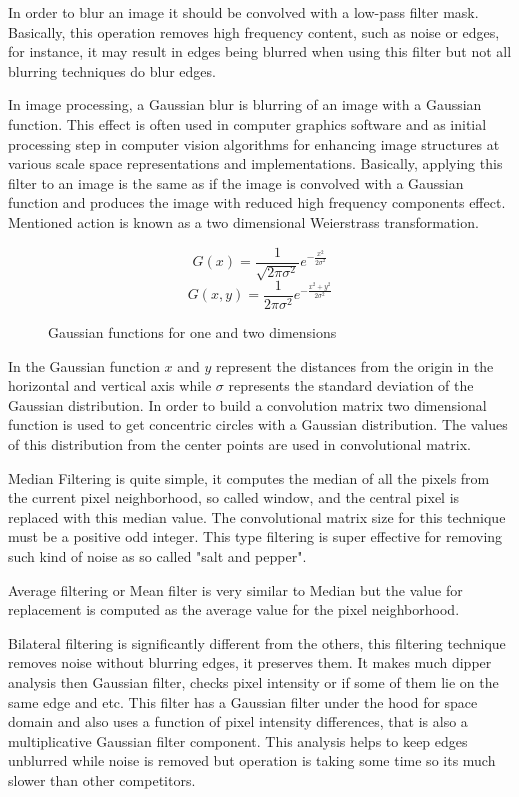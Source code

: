 \documentclass[../../../../main]{subfiles}
\begin{document}
In order to blur an image it should be convolved with a low-pass filter mask. Basically, this operation removes high frequency content, such as noise or edges, for instance, it may result in edges being blurred when using this filter but not all blurring techniques do blur edges.

In image processing, a Gaussian blur is blurring of an image with a Gaussian function. This effect is often used in computer graphics software and as initial processing step in computer vision algorithms for enhancing image structures at various scale space representations and implementations. Basically, applying this filter to an image is the same as if the image is convolved with a Gaussian function and produces the image with reduced high frequency components effect. Mentioned action is known as a two dimensional Weierstrass transformation.

\begin{figure} [!ht]
  \centering
    \begin{equation}
        G(x)=\frac{1}{\sqrt{2\pi\sigma^2}}e^{-\frac{x^2}{2\sigma^2}}
    \end{equation}
    \begin{equation}
        G(x,y)=\frac{1}{2\pi\sigma^2}e^{-\frac{x^2+y^2}{2\sigma^2}}
    \end{equation}
  \caption{Gaussian functions for one and two dimensions}
\end{figure}

In the Gaussian function $x$ and $y$ represent the distances from the origin in the horizontal and vertical axis while $\sigma$ represents the standard deviation of the Gaussian distribution. In order to build a convolution matrix two dimensional function is used to get concentric circles with a Gaussian distribution. The values of this distribution from the center points are used in convolutional matrix.

Median Filtering is quite simple, it computes the median of all the pixels from the current pixel neighborhood, so called window, and the central pixel is replaced with this median value. The convolutional matrix size for this technique must be a positive odd integer. This type filtering is super effective for removing such kind of noise as so called "salt and pepper".

Average filtering or Mean filter is very similar to Median but the value for replacement is computed as the average value for the pixel neighborhood.

Bilateral filtering is significantly different from the others, this filtering technique removes noise without blurring edges, it preserves them. It makes much dipper analysis then Gaussian filter, checks pixel intensity or if some of them lie on the same edge and etc. This filter has a Gaussian filter under the hood for space domain and also uses a function of pixel intensity differences, that is also a multiplicative Gaussian filter component. This analysis helps to keep edges unblurred while noise is removed but operation is taking some time so its much slower than other competitors.
\end{document}
